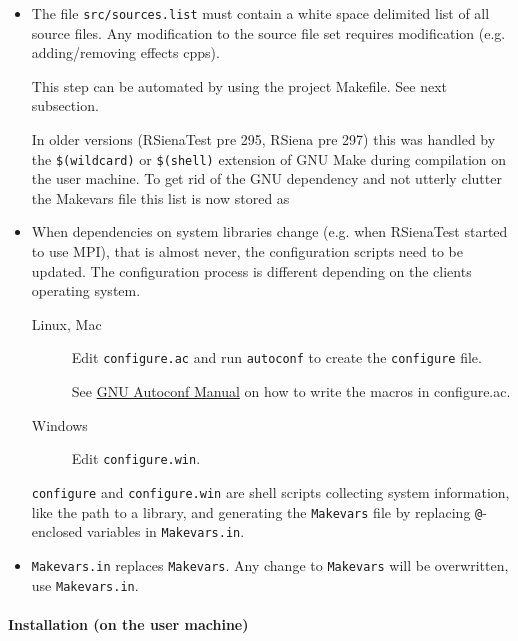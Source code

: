 \documentclass[12pt, a4paper]{article}
\renewcommand{\=}{\,=\,}
\newcommand{\+}{\,+\,}
\begin{document}
\begin{itemize}
  \item The file \texttt{src/sources.list} must contain a white space
    delimited list of all source files. Any modification to the source file
    set requires modification (e.g. adding/removing effects cpps).

    This step can be automated by using the project Makefile. See next
    subsection.

    In older versions (RSienaTest pre 295, RSiena pre 297) this was handled by
    the \texttt{\$(wildcard)} or \texttt{\$(shell)} extension of GNU Make
    during compilation on the user machine. To get rid of the GNU dependency
    and not utterly clutter the Makevars file this list is now stored as

  \item When dependencies on system libraries change (e.g. when RSienaTest
    started to use MPI), that is almost never, the configuration scripts need
    to be updated. The configuration process is different depending on the
    clients operating system.

    \begin{description}
      \item[Linux, Mac] Edit \texttt{configure.ac} and run \texttt{autoconf}
        to create the \texttt{configure} file.

        See \href{https://www.gnu.org/software/autoconf/manual/index.html}{GNU
        Autoconf Manual} on how to write the macros in configure.ac.

      \item[Windows] Edit \texttt{configure.win}.

    \end{description}

    \texttt{configure} and \texttt{configure.win} are shell scripts collecting
    system information, like the path to a library, and generating the
    \texttt{Makevars} file by replacing \texttt{@}-enclosed variables in
    \texttt{Makevars.in}.

  \item \texttt{Makevars.in} replaces \texttt{Makevars}. Any change to
    \texttt{Makevars} will be overwritten, use \texttt{Makevars.in}.

\end{itemize}

\paragraph{Installation (on the user machine)}
\end{document}
